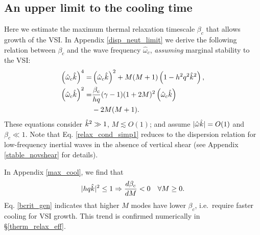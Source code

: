 \subsection{An upper limit to the cooling time}\label{iso_vsi_beta_crit}
Here we estimate the maximum thermal relaxation timescale 
$\beta_c$ that allows growth of the VSI. In Appendix \ref{disp_neut_limit}
we derive the following relation between $\beta_c$ and the wave
frequency $\hat{\omega}_c$, \emph{assuming} marginal stability to the
VSI:  
\begin{subequations}\begin{align}
    \left(\hat{\omega}_c\hat{k}\right)^4  =& \left(\hat{\omega}_c\hat{k}\right)^2 
  + M(M+1)\left(1-h^2q^2\hat{k}^2\right) ,\label{relax_cond_simp1}  \\
  \left(\hat{\omega}_c\hat{k}\right)^2 = & \frac{\beta_c}{h q} (\gamma-1)(1+2M)^2
  \left(\hat{\omega}_c\hat{k}\right) \label{relax_cond_simp2}\\
  &- 2M(M+1) . \notag
\end{align}\end{subequations}
These equations consider $\hat{k}^2\gg 1$, $M\lesssim O(1)$; and assume 
$|\hat{\omega}\hat{k}| = O(1)$ and $\beta_c\ll 1$.   Note that
Eq. \ref{relax_cond_simp1} reduces to the
dispersion relation for low-frequency inertial waves in the absence of
vertical shear (see Appendix \ref{stable_novshear} for details). 
 
In Appendix \ref{max_cool}, we find that %
\begin{align}
  |hq\hat{k}|^2 \leq 1 \Rightarrow \frac{d\beta_c}{dM} < 0 \quad \forall
  M\geq 0. \label{bcrit_gen}
\end{align}
Eq. \ref{bcrit_gen} indicates that higher $M$ modes have lower $\beta_c$,
i.e.\ require faster cooling for VSI growth. This trend is confirmed
numerically in \S\ref{therm_relax_eff}.  

